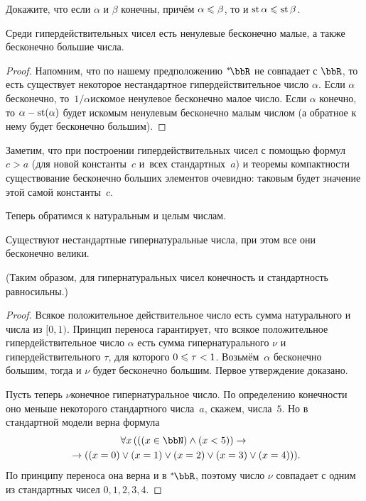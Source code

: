 \begin{problem}
Докажите, что если $\alpha$ и $\beta$ конечны, причём
$\alpha\hm\le\beta$, то и  $\st\alpha\hm\le\st\beta$.
\end{problem}

\begin{theorem}
Среди гипердействительных чисел есть ненулевые бесконечно малые,
а также бесконечно большие числа.
\end{theorem}

\begin{proof}
Напомним, что по нашему предположению $\nstR$ не совпадает с
$\bbR$, то есть существует некоторое нестандартное
гипердействительное число $\alpha$. Если $\alpha$ бесконечно,
то~$1/\alpha$\т искомое ненулевое бесконечно малое число. Если
$\alpha$ конечно, то $\alpha-\operatorname{st}(\alpha)$ будет искомым ненулевым
бесконечно малым числом (а обратное к нему будет бесконечно
большим).
\end{proof}

Заметим, что при построении гипердействительных чисел с помощью
формул $c>a$ (для новой константы~$c$ и~всех стандартных~$a$) и
теоремы компактности существование бесконечно больших элементов
очевидно: таковым будет значение этой самой константы~$c$.

Теперь обратимся к натуральным и целым числам.

\begin{theorem}
Существуют нестандартные гипернатуральные числа, при этом
все они бесконечно велики.
\end{theorem}

(Таким образом, для гипернатуральных чисел конечность и
стандартность равносильны.)

\begin{proof}
Всякое положительное действительное число есть сумма
натурального и числа из $[0,1)$. Принцип переноса гарантирует,
что всякое положительное гипердействительное число $\alpha$ есть
сумма гипернатурального $\nu$ и гипердействительного $\tau$, для
которого $0\hm\le\tau\hm< 1$. Возьмём~$\alpha$ бесконечно
большим, тогда и $\nu$ будет бесконечно большим. Первое утверждение
доказано.

Пусть теперь $\nu$\т конечное гипернатуральное число. По определению
конечности оно меньше некоторого стандартного числа~$a$,
скажем, числа~$5$. Но в стандартной модели верна формула
        \begin{multline*}
\forall x\, ( ((x\in\bbN) \land (x<5)) \to{} \\
   {}\to((x=0)\lor (x=1)\lor (x=2)\lor (x=3)\lor (x=4))).
        \end{multline*}
По принципу переноса она верна и в $\nstR$, поэтому число
$\nu$ совпадает с одним из стандартных чисел $0,1,2,3,4$.
\end{proof}

